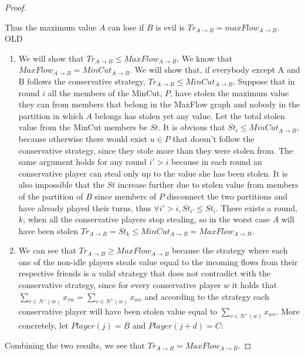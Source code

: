 \documentclass[11pt]{article}
\theoremstyle{definition}
\theoremstyle{corollary}
\theoremstyle{lemma}
\begin{document}
\begin{proof}
\begin{itemize}
       \end{itemize}
       Thus the maximum value $A$ can lose if $B$ is evil is $Tr_{A \rightarrow B} = maxFlow_{A \rightarrow B}$.
\ \\ OLD
       \begin{enumerate}
	   \item We will show that $Tr_{A \rightarrow B} \leq MaxFlow_{A \rightarrow B}$.
          We know that $MaxFlow_{A \rightarrow B} = MinCut_{A \rightarrow B}$. We will show that, if everybody except
          A and B follows the conservative strategy,  $Tr_{A \rightarrow B} \leq MinCut_{A \rightarrow B}$. Suppose that in
          round $i$ all the members of the MinCut, $P$, have stolen the maximum value they can from members that belong
          in the MaxFlow graph and nobody in the partition in which $A$ belongs has stolen yet any value. Let the total
          stolen value from the MinCut members be $St$. It is obvious that $St_i \leq MinCut_{A \rightarrow B}$, because
          otherwise there would exist $u \in P$ that doesn't follow the conservative strategy, since they stole more than they
          were stolen from. The same argument holds for any round $i' > i$ because in each round an conservative player can
          steal only up to the value she has been stolen. It is also impossible that the $St$ increase further due to
          stolen value from members of the partition of $B$ since members of $P$ disconnect the two partitions and have
          already played their turns, thus $\forall i' > i, St_{i'} \leq St_i$. There exists a round, $k$, when all the
          conservative players stop stealing, so in the worst case $A$ will have been stolen
          $Tr_{A \rightarrow B} = St_k \leq MinCut_{A \rightarrow B} = MaxFlow_{A \rightarrow B}$.
          \item We can see that $Tr_{A \rightarrow B} \geq MaxFlow_{A \rightarrow B}$ because the strategy where each
          one of the non-idle players steals value equal to the incoming flows from their respective friends is a valid
          strategy that does not contradict with the conservative strategy, since for every conservative player $w$ it holds that
          $\sum\limits_{v \in N^{-}(w)}x_{vw} = \sum\limits_{v \in N^{+}(w)}x_{wv}$ and according to the strategy each
          conservative player will have been stolen value equal to $\sum\limits_{v \in N^{+}(w)}x_{wv}$. More concretely,
          let $Player(j) = B$ and $Player(j+d) = C :$
       \end{enumerate}
       Combining the two results, we see that $Tr_{A \rightarrow B} = MaxFlow_{A \rightarrow B}$.

\end{proof}
\end{document}
